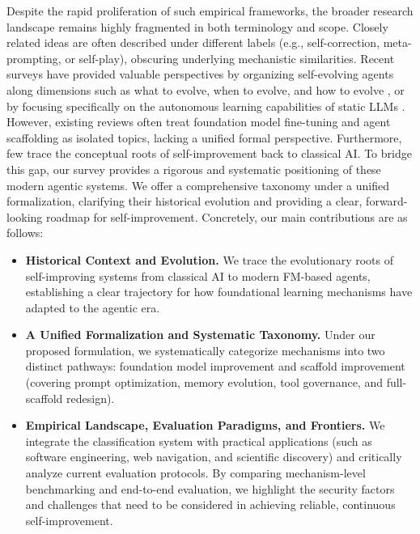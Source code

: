 \documentclass{article}
\begin{document}
Despite the rapid proliferation of such empirical frameworks, the broader research landscape remains highly fragmented in both terminology and scope. Closely related ideas are often described under different labels (e.g., self-correction, meta-prompting, or self-play), obscuring underlying mechanistic similarities. Recent surveys have provided valuable perspectives by organizing self-evolving agents along dimensions such as what to evolve, when to evolve, and how to evolve \citep{gao2025surveyselfevolvingagentspath, fang2025comprehensivesurveyselfevolvingai}, or by focusing specifically on the autonomous learning capabilities of static LLMs \citep{tao2024surveyselfevolutionlargelanguage}. 
However, existing reviews often treat foundation model fine-tuning and agent scaffolding as isolated topics, lacking a unified formal perspective. Furthermore, few trace the conceptual roots of self-improvement back to classical AI. To bridge this gap, our survey provides a rigorous and systematic positioning of these modern agentic systems. We offer a comprehensive taxonomy under a unified formalization, clarifying their historical evolution and providing a clear, forward-looking roadmap for self-improvement. Concretely, our main contributions are as follows:
\begin{itemize}
    \item \textbf{Historical Context and Evolution.} We trace the evolutionary roots of self-improving systems from classical AI to modern FM-based agents, establishing a clear trajectory for how foundational learning mechanisms have adapted to the agentic era.
    \item \textbf{A Unified Formalization and Systematic Taxonomy.} Under our proposed formulation, we systematically categorize mechanisms into two distinct pathways: foundation model improvement and  scaffold improvement (covering prompt optimization, memory evolution, tool governance, and full-scaffold redesign).    
    \item \textbf{Empirical Landscape, Evaluation Paradigms, and Frontiers.} We integrate the classification system with practical applications (such as software engineering, web navigation, and scientific discovery) and critically analyze current evaluation protocols. By comparing mechanism-level benchmarking and end-to-end evaluation, we highlight the security factors and challenges that need to be considered in achieving reliable, continuous self-improvement.
\end{itemize}
\end{document}
